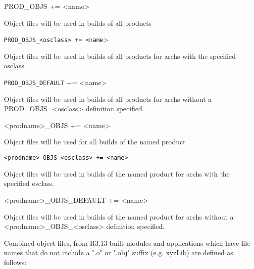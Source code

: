 \begin{description}\item {}PROD\_OBJS += \textless{}name\textgreater{}

\end{description}Object files will be used in builds of all products

\begin{description}\item \verb|PROD_OBJS_<osclass> += <name|\textgreater{}

\end{description}Object files will be used in builds of all products for archs with the specified osclass.

\begin{description}\item \verb|PROD_OBJS_DEFAULT| += \textless{}name\textgreater{}

\end{description}Object files will be used in builds of all products for archs without a PROD\_OBJS\_\textless{}osclass\textgreater{} definition 
specified.

\begin{description}\item \textless{}prodname\textgreater{}\_OBJS += \textless{}name\textgreater{}

\end{description}Object files will be used for all builds of the named product

\begin{description}\item \verb|<prodname>_OBJS_<osclass> += <name>| 

\end{description}Object files will be used in builds of the named product for archs with the specified osclass.

\begin{description}\item \textless{}prodname\textgreater{}\_OBJS\_DEFAULT += \textless{}name\textgreater{}

\end{description}Object files will be used in builds of the named product for archs without a \textless{}prodname\textgreater{}\_OBJS\_\textless{}osclass\textgreater{} 
definition specified.

Combined object files, from R3.13 built modules and applications which have file names that do not include a ".o" or 
".obj" suffix (e.g. xyzLib) are defined as follows:

